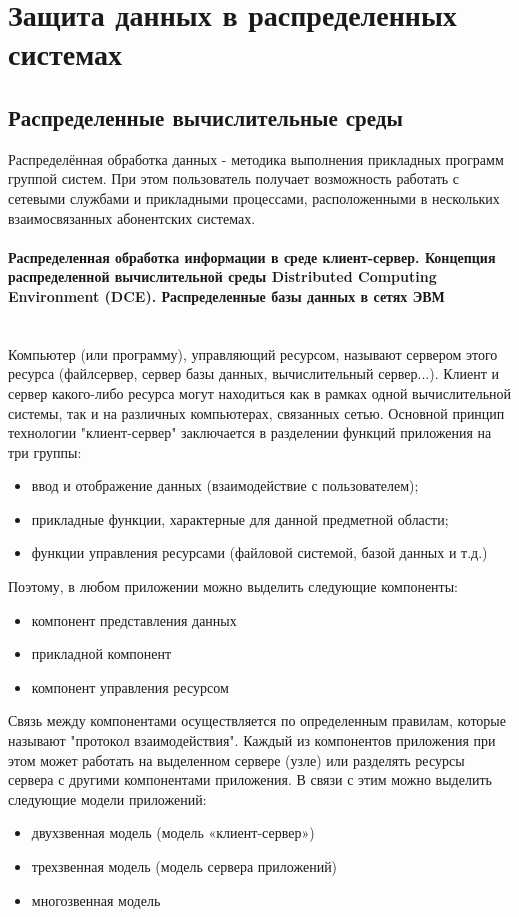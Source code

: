 \section{Защита данных в распределенных системах}
\subsection{Распределенные вычислительные среды}
Распределённая обработка данных - методика выполнения прикладных программ группой систем.
При этом пользователь получает возможность работать с сетевыми службами и прикладными процессами,
расположенными в нескольких взаимосвязанных абонентских системах. \autocite{Sergeeva}

\paragraph{
    Распределенная обработка информации в среде клиент-сервер.
    Концепция распределенной вычислительной среды Distributed Computing Environment (DCE).
    Распределенные базы данных в сетях ЭВМ
} ~\\

Компьютер (или программу), управляющий ресурсом, называют сервером этого ресурса (файлсервер, сервер базы данных,
вычислительный сервер...). Клиент и сервер какого-либо ресурса могут находиться как в рамках одной вычислительной системы,
так и на различных компьютерах, связанных сетью. Основной принцип технологии "клиент-сервер" заключается в разделении
функций приложения на три группы:
\begin{itemize}
    \item ввод и отображение данных (взаимодействие с пользователем);
    \item прикладные функции, характерные для данной предметной области;
    \item функции управления ресурсами (файловой системой, базой данных и т.д.)
\end{itemize}

Поэтому, в любом приложении можно выделить следующие компоненты:
\begin{itemize}
    \item компонент представления данных
    \item прикладной компонент
    \item компонент управления ресурсом
\end{itemize}

Связь между компонентами осуществляется по определенным правилам, которые называют "протокол взаимодействия".
Каждый из компонентов приложения при этом может работать на выделенном сервере (узле) или разделять ресурсы сервера
с другими компонентами приложения. В связи с этим можно выделить следующие модели приложений:
\begin{itemize}
    \item двухзвенная модель (модель «клиент-сервер»)
    \item трехзвенная модель (модель сервера приложений)
    \item многозвенная модель
\end{itemize}

